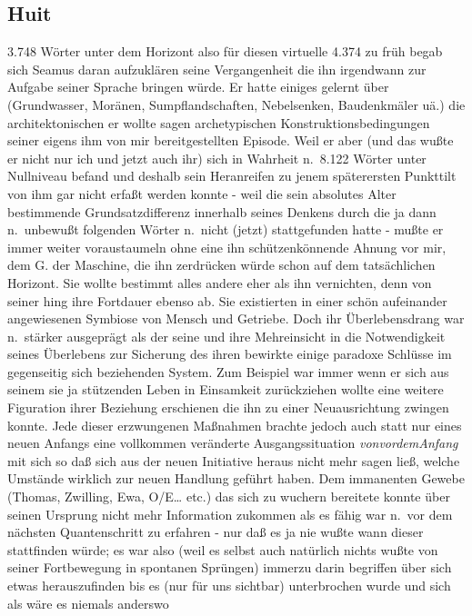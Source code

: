 \documentclass[
]{article}
\author{}
\date{\vspace{-2.5em}}
\begin{document}
\subsection{Huit}\label{huit}

3.748 Wörter unter dem Horizont also für diesen virtuelle 4.374 zu früh
begab sich Seamus daran aufzuklären seine Vergangenheit die ihn
irgendwann zur Aufgabe seiner Sprache bringen würde. Er hatte einiges
gelernt über (Grundwasser, Moränen, Sumpflandschaften, Nebelsenken,
Baudenkmäler uä.) die architektonischen er wollte sagen archetypischen
Konstruktionsbedingungen seiner eigens ihm von mir bereitgestellten
Episode. Weil er aber (und das wußte er nicht nur ich und jetzt auch
ihr) sich in Wahrheit n.~8.122 Wörter unter Nullniveau befand und
deshalb sein Heranreifen zu jenem späterersten Punkttilt von ihm gar
nicht erfaßt werden konnte - weil die sein absolutes Alter bestimmende
Grundsatzdifferenz innerhalb seines Denkens durch die ja dann
n.~unbewußt folgenden Wörter n.~nicht (jetzt) stattgefunden hatte -
mußte er immer weiter voraustaumeln ohne eine ihn schützenkönnende
Ahnung vor mir, dem G. der Maschine, die ihn zerdrücken würde schon auf
dem tatsächlichen Horizont. Sie wollte bestimmt alles andere eher als
ihn vernichten, denn von seiner hing ihre Fortdauer ebenso ab. Sie
existierten in einer schön aufeinander angewiesenen Symbiose von Mensch
und Getriebe. Doch ihr Überlebensdrang war n.~stärker ausgeprägt als der
seine und ihre Mehreinsicht in die Notwendigkeit seines Überlebens zur
Sicherung des ihren bewirkte einige paradoxe Schlüsse im gegenseitig
sich beziehenden System. Zum Beispiel war immer wenn er sich aus seinem
sie ja stützenden Leben in Einsamkeit zurückziehen wollte eine weitere
Figuration ihrer Beziehung erschienen die ihn zu einer Neuausrichtung
zwingen konnte. Jede dieser erzwungenen Maßnahmen brachte jedoch auch
statt nur eines neuen Anfangs eine vollkommen veränderte
Ausgangssituation \emph{vonvordemAnfang} mit sich so daß sich aus der
neuen Initiative heraus nicht mehr sagen ließ, welche Umstände wirklich
zur neuen Handlung geführt haben. Dem immanenten Gewebe (Thomas,
Zwilling, Ewa, O/E\ldots{} etc.) das sich zu wuchern bereitete konnte
über seinen Ursprung nicht mehr Information zukommen als es fähig war
n.~vor dem nächsten Quantenschritt zu erfahren - nur daß es ja nie wußte
wann dieser stattfinden würde; es war also (weil es selbst auch
natürlich nichts wußte von seiner Fortbewegung in spontanen Sprüngen)
immerzu darin begriffen über sich etwas herauszufinden bis es (nur für
uns sichtbar) unterbrochen wurde und sich als wäre es niemals anderswo
\end{document}
